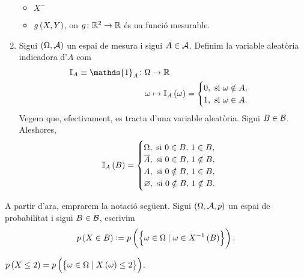 \begin{example}
\begin{enumerate}[1.]
\begin{itemize}
                \item $X^-$
                \item $g\left( X, Y\right)$, on $g\colon \mathbb{R}^2\to\mathbb{R}$ és ua funció mesurable.
            \end{itemize}
        \item Sigui $\left( \Omega, \mathcal{A}\right)$ un espai de mesura i sigui $A\in\mathcal{A}$. Definim la variable aleatòria indicadora d'$A$ com
            \begin{align*}
                \mathbb{I}_A\equiv\mathds{1}_A\colon \Omega &\to\real\\
                \omega &\mapsto\mathbb{I}_A\lp\omega\rp=\begin{cases}
                    0, \text{ si } \omega\notin A,\\
                    1, \text{ si } \omega\in A.
                \end{cases}
            \end{align*}
            Vegem que, efectivament, es tracta d'una variable aleatòria. Sigui $B\in\mathcal{B}$. Aleshores,
            \[
                \mathbb{I}_A\left( B\right)=\begin{cases}
                    \Omega, \text{ si } 0\in B,\, 1\in B,\\
                    \overline{A}, \text{ si } 0\in B,\, 1\notin B,\\
                    A, \text{ si } 0\notin B,\, 1\in B,\\
                    \varnothing, \text{ si } 0\notin B,\, 1\notin B.
                \end{cases}
            \]
    \end{enumerate}
\end{example}

\begin{obs}
    A partir d'ara, emprarem la notació següent. Sigui $(\Omega,\mathcal{A}, p)$ un espai de probabilitat i sigui $B\in\mathcal{B}$, escrivim
    \[
        p\left( X\in B\right):= p\left(\left\{\omega\in\Omega\mid\omega\in X^{-1}\left( B\right)\right\}\right).
    \]
\end{obs}

\begin{example}
    $p\left( X\leq 2\right) = p\left(\left\{\omega\in\Omega\mid X\left(\omega\right)\leq 2\right\}\right)$.
\end{example}

